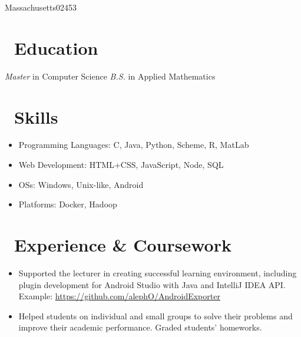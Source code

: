 \documentclass{resume}
\begin{document}


\address{116 Russell St}{Massachusetts}{02453}
 
\section{\texorpdfstring{\faGraduationCap}\ \ Education}
\textit{Master} in Computer Science
\textit{B.S.} in Applied Mathematics



\section{\texorpdfstring{\faCogs}\ \ Skills}
\begin{itemize}[parsep=0.5ex]
  \item Programming Languages: C, Java, Python, Scheme, R, MatLab
  \item Web Development: HTML+CSS, JavaScript, Node, SQL
  \item OSs: Windows, Unix-like, Android
  \item Platforms: Docker, Hadoop
\end{itemize}



\section{\texorpdfstring{\faUsers}\ \ Experience \& Coursework}

\begin{itemize}
  \item Supported the lecturer in creating successful learning environment, including plugin development for Android Studio with Java and IntelliJ IDEA API. 
  \newline
  Example: \href{https://github.com/alephO/AndroidExporter}{https://github.com/alephO/AndroidExporter}
  \item Helped students on individual and small groups to solve their problems and improve their academic performance. Graded students' homeworks.
\end{itemize}
\end{document}
